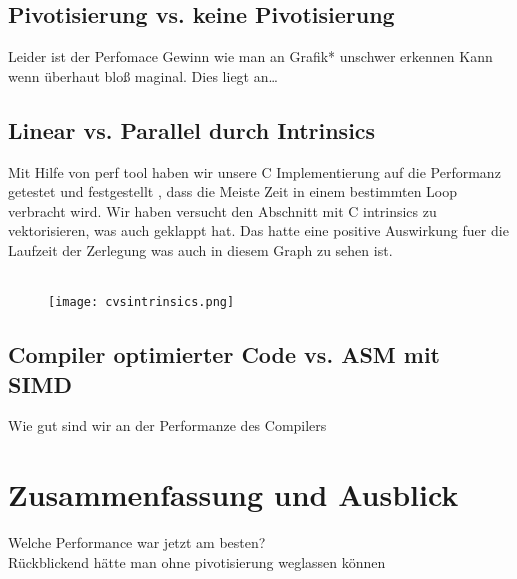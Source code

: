 \documentclass[course=erap]{aspdoc}
\begin{document}
\subsection{Pivotisierung vs. keine Pivotisierung}
Leider ist der Perfomace Gewinn wie man an Grafik* unschwer erkennen Kann wenn überhaut bloß maginal. Dies liegt an\ldots
\subsection{Linear vs. Parallel durch Intrinsics}
Mit Hilfe von perf tool haben wir unsere C Implementierung auf die Performanz getestet und festgestellt , dass die Meiste Zeit in einem bestimmten Loop verbracht wird.
 Wir haben versucht den Abschnitt mit C intrinsics zu vektorisieren, was auch geklappt hat. Das hatte eine positive Auswirkung fuer die Laufzeit der Zerlegung was auch in diesem Graph zu sehen ist.\\\\
 \begin{figure}[t]
 \centering
 \texttt{[image: cvsintrinsics.png]}
 \label{CvsIntrinsics}
\end{figure}

 \subsection{Compiler optimierter Code vs. ASM mit SIMD}

Wie gut sind wir an der Performanze des Compilers




\section{Zusammenfassung und Ausblick}
Welche Performance war jetzt am besten?\\
Rückblickend hätte man ohne pivotisierung weglassen können\\

{}
\end{document}

